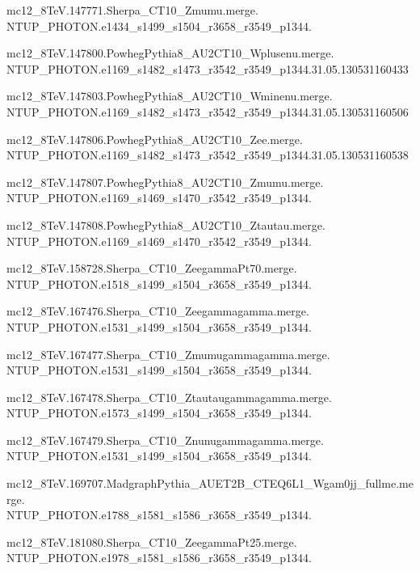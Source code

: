 mc12\_8TeV.147771.Sherpa\_CT10\_Zmumu.merge. \\NTUP\_PHOTON.e1434\_s1499\_s1504\_r3658\_r3549\_p1344.

mc12\_8TeV.147800.PowhegPythia8\_AU2CT10\_Wplusenu.merge. \\NTUP\_PHOTON.e1169\_s1482\_s1473\_r3542\_r3549\_p1344.31.05.130531160433

mc12\_8TeV.147803.PowhegPythia8\_AU2CT10\_Wminenu.merge. \\NTUP\_PHOTON.e1169\_s1482\_s1473\_r3542\_r3549\_p1344.31.05.130531160506

mc12\_8TeV.147806.PowhegPythia8\_AU2CT10\_Zee.merge. \\NTUP\_PHOTON.e1169\_s1482\_s1473\_r3542\_r3549\_p1344.31.05.130531160538

mc12\_8TeV.147807.PowhegPythia8\_AU2CT10\_Zmumu.merge. \\NTUP\_PHOTON.e1169\_s1469\_s1470\_r3542\_r3549\_p1344.

mc12\_8TeV.147808.PowhegPythia8\_AU2CT10\_Ztautau.merge. \\NTUP\_PHOTON.e1169\_s1469\_s1470\_r3542\_r3549\_p1344.

mc12\_8TeV.158728.Sherpa\_CT10\_ZeegammaPt70.merge. \\NTUP\_PHOTON.e1518\_s1499\_s1504\_r3658\_r3549\_p1344.

mc12\_8TeV.167476.Sherpa\_CT10\_Zeegammagamma.merge. \\NTUP\_PHOTON.e1531\_s1499\_s1504\_r3658\_r3549\_p1344.

mc12\_8TeV.167477.Sherpa\_CT10\_Zmumugammagamma.merge. \\NTUP\_PHOTON.e1531\_s1499\_s1504\_r3658\_r3549\_p1344.

mc12\_8TeV.167478.Sherpa\_CT10\_Ztautaugammagamma.merge. \\NTUP\_PHOTON.e1573\_s1499\_s1504\_r3658\_r3549\_p1344.

mc12\_8TeV.167479.Sherpa\_CT10\_Znunugammagamma.merge. \\NTUP\_PHOTON.e1531\_s1499\_s1504\_r3658\_r3549\_p1344.

mc12\_8TeV.169707.MadgraphPythia\_AUET2B\_CTEQ6L1\_Wgam0jj\_fullme.merge. \\NTUP\_PHOTON.e1788\_s1581\_s1586\_r3658\_r3549\_p1344.

mc12\_8TeV.181080.Sherpa\_CT10\_ZeegammaPt25.merge. \\NTUP\_PHOTON.e1978\_s1581\_s1586\_r3658\_r3549\_p1344.
